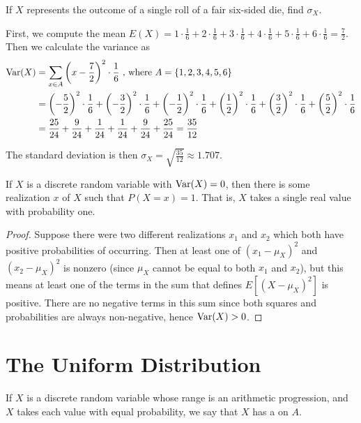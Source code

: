 \begin{example}\label{stdevoneroll}
If $X$ represents the outcome of a single roll of a fair six-sided die, find $\sigma_X$.

First, we compute the mean $E(X) = 1 \cdot \frac{1}{6} + 2 \cdot \frac{1}{6} + 3 \cdot \frac{1}{6} + 4 \cdot \frac{1}{6} + 5 \cdot \frac{1}{6} + 6 \cdot \frac{1}{6} = \frac{7}{2}$. Then we calculate the variance as
$$\begin{aligned}
\operatorname{Var}(X) &= \sum_{x \in A} \left(x - \frac{7}{2}\right)^2 \cdot \frac{1}{6} \text{\ , where } A = \{1,2,3,4,5,6\} \\
&= \left(-\frac{5}{2}\right)^2 \cdot \frac{1}{6} + \left(-\frac{3}{2}\right)^2 \cdot \frac{1}{6} + \left(- \frac{1}{2}\right)^2 \cdot \frac{1}{6} + \left(\frac{1}{2}\right)^2 \cdot \frac{1}{6} + \left(\frac{3}{2}\right)^2 \cdot \frac{1}{6} + \left(\frac{5}{2}\right)^2 \cdot \frac{1}{6} \\
&= \frac{25}{24} + \frac{9}{24} + \frac{1}{24} + \frac{1}{24} + \frac{9}{24} + \frac{25}{24} = \frac{35}{12} \\
\end{aligned}$$

The standard deviation is then $\sigma_X = \sqrt{\frac{35}{12}}\approx 1.707$.
\end{example}

\begin{proposition}If $X$ is a discrete random variable with $\operatorname{Var}(X) = 0$, then there is some realization $x$ of $X$ such that $P(X = x) = 1$. That is, $X$ takes a single real value with probability one.
\end{proposition}

\begin{proof}
Suppose there were two different realizations $x_1$ and $x_2$ which both have positive probabilities of occurring. Then at least one of $(x_1 - \mu_X)^2$ and $(x_2 - \mu_X)^2$ is nonzero (since $\mu_X$ cannot be equal to both $x_1$ and $x_2$), but this means at least one of the terms in the sum that defines $E[(X-\mu_X)^2]$ is positive. There are no negative terms in this sum since both squares and probabilities are always non-negative, hence $\operatorname{Var}(X) > 0$.
\end{proof}

\section{The Uniform Distribution}

\begin{definition} If $X$ is a discrete random variable whose range is an arithmetic progression, and $X$ takes each value with equal probability, we say that $X$ has a  on $A$. \end{definition}

